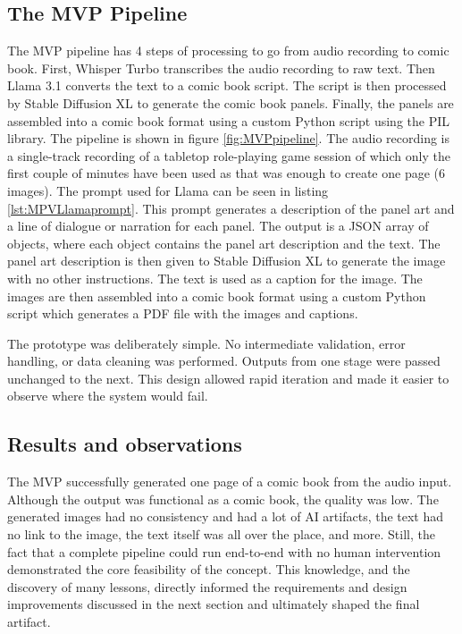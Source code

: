 \subsection*{The MVP Pipeline}
The MVP pipeline has 4 steps of processing to go from audio recording to comic book. First, Whisper Turbo transcribes the audio recording to raw text. Then Llama 3.1 converts the text to a comic book script. The script is then processed by Stable Diffusion XL to generate the comic book panels. Finally, the panels are assembled into a comic book format using a custom Python script using the PIL library. The pipeline is shown in figure \ref{fig:MVPpipeline}. The audio recording is a single-track recording of a tabletop role-playing game session of which only the first couple of minutes have been used as that was enough to create one page (6 images). The prompt used for Llama can be seen in listing \ref{lst:MPVLlamaprompt}. This prompt generates a description of the panel art and a line of dialogue or narration for each panel. The output is a JSON array of objects, where each object contains the panel art description and the text. The panel art description is then given to Stable Diffusion XL to generate the image with no other instructions. The text is used as a caption for the image. The images are then assembled into a comic book format using a custom Python script which generates a PDF file with the images and captions.

The prototype was deliberately simple. No intermediate validation, error handling, or data cleaning was performed. Outputs from one stage were passed unchanged to the next. This design allowed rapid iteration and made it easier to observe where the system would fail.

\subsection*{Results and observations}
The MVP successfully generated one page of a comic book from the audio input. Although the output was functional as a comic book, the quality was low. The generated images had no consistency and had a lot of AI artifacts, the text had no link to the image, the text itself was all over the place, and more. Still, the fact that a complete pipeline could run end-to-end with no human intervention demonstrated the core feasibility of the concept. This knowledge, and the discovery of many lessons, directly informed the requirements and design improvements discussed in the next section and ultimately shaped the final artifact.

